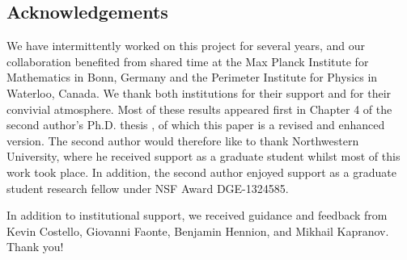 


\subsection*{Acknowledgements}

We have intermittently worked on this project for several years,
and our collaboration benefited from shared time at the Max Planck Institute for Mathematics in Bonn, Germany and the Perimeter Institute for Physics in Waterloo, Canada.
We thank both institutions for their support and for their convivial atmosphere.
Most of these results appeared first in Chapter 4 of the second author's Ph.D. thesis \cite{BWthesis},
of which this paper is a revised and enhanced version. 
The second author would therefore like to thank Northwestern University, where he received support as a graduate student whilst most of this work took place.
In addition, the second author enjoyed support as a graduate student research fellow under NSF Award DGE-1324585. 

In addition to institutional support, we received guidance and feedback from Kevin Costello, Giovanni Faonte, Benjamin Hennion, and Mikhail Kapranov. Thank you!

